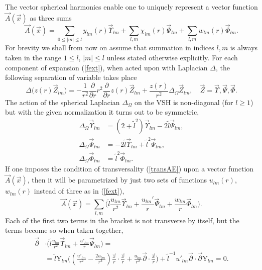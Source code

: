 \documentclass[12pt]{article}
\newcommand{\pl}{\partial}
\newcommand{\plr}{\partial r}
\newcommand{\Dtph}{\Delta_{\Omega}}
\newcommand{\YY}{\mathrm{Y}}
\begin{document}
	The vector spherical harmonics enable one to uniquely represent
	a vector function
$ \vec{A}(\vec{x}) $
	as three sums
\begin{equation}
\label{fext}
    \vec{A}(\vec{x}) =
        \sum_{0\leq |m| \leq l} y_{lm}(r) \vec{\Upsilon}_{lm} +
        \sum_{l,m} \chi_{lm}(r) \vec{\Psi}_{lm} +
        \sum_{l,m} w_{lm}(r) \vec{\Phi}_{lm} .
\end{equation}
	For brevity we shall from now on assume that summation in indices
$ l,m $
	is always taken in the range
$ 1 \leq l $, 
$ |m| \leq l $
	unless stated otherwise explicitly.
	For each component of expansion
(\ref{fext}),
	when acted upon with Laplacian
$ \Delta $,
	the following separation of variable takes place
\begin{equation*}
    \Delta \bigl(z(r) \vec{Z}_{lm}\bigr) =
-\frac{1}{r^{2}} \frac{\pl}{\plr} r^{2} \frac{\pl}{\plr} z(r) \vec{Z}_{lm}
        + \frac{z(r)}{r^{2}} \Dtph \vec{Z}_{lm}, \quad
            \vec{Z} = \vec{\Upsilon}, \vec{\Psi}, \vec{\Phi} .
\end{equation*}
	The action of the spherical Laplacian
$ \Dtph $
	on the VSH is non-diagonal (for
$ l \geq 1 $)
	but with the given normalization
	it turns out to be symmetric,
\begin{align*}
    \Dtph \vec{\Upsilon}_{lm} &= (2+\tilde{l}^{2}) \vec{\Upsilon}_{lm}
            - 2 \tilde{l} \vec{\Psi}_{lm} ,\\
                  \Dtph \vec{\Psi}_{lm} &= -2 \tilde{l}
\vec{\Upsilon}_{lm}
            + \tilde{l}^{2} \vec{\Psi}_{lm} ,\\
    \Dtph \vec{\Phi}_{lm} &= \tilde{l}^{2} \vec{\Phi}_{lm} .
\end{align*}
	If one imposes the condition of transversality
(\ref{transAE})
	upon a vector function
$ \vec{A}(\vec{x}) $,
	then it will be parametrized by just two sets of functions
$ u_{lm}(r) $,
$ w_{lm}(r) $
	instead of three as in 
(\ref{fext}),
\begin{equation}
\label{Atrexp}
    \vec{A}(\vec{x}) =
        \sum_{l,m} \bigl(\tilde{l}
	    \frac{u_{lm}}{r^{2}} \vec{\Upsilon}_{lm} +
        \frac{u_{lm}'}{r} \vec{\Psi}_{lm} 
    +   \frac{w_{lm}}{r} \vec{\Phi}_{lm} \bigr) .
\end{equation}
    Each of the first two terms in the bracket is not transverse by itself,
    but the terms become so when taken together,
\begin{align}
\label{treq}
    \vec{\pl} &\cdot
\bigl(\tilde{l}\frac{u_{lm}}{r^{2}}\vec{\Upsilon}_{lm}
        +\frac{u'_{lm}}{r}\vec{\Psi}_{lm}\bigr) =\\
\nonumber
    &= \tilde{l} \YY_{lm}
        \bigl( (\frac{u'_{lm}}{r^{2}}-\frac{2u_{lm}}{r^{3}})
        \frac{\vec{x}}{r}\cdot\frac{\vec{x}}{r} 
    + \frac{u_{lm}}{r^{2}} \vec{\pl}\cdot \frac{\vec{x}}{r} \bigr) 
    + \tilde{l}^{-1} u'_{lm} \vec{\pl}\cdot\vec{\pl} \YY_{lm} = 0 .
\end{align}
\end{document}
